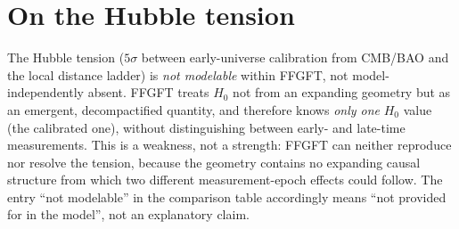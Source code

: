 
\section*{On the Hubble tension}

The Hubble tension ($5\sigma$ between early-universe calibration from
CMB/BAO and the local distance ladder) is \emph{not modelable} within FFGFT,
not model-independently absent. FFGFT treats $H_0$ not from an expanding
geometry but as an emergent, decompactified quantity, and therefore knows
\emph{only one} $H_0$ value (the calibrated one), without distinguishing
between early- and late-time measurements. This is a weakness, not a
strength: FFGFT can neither reproduce nor resolve the tension, because the
geometry contains no expanding causal structure from which two different
measurement-epoch effects could follow. The entry ``not modelable'' in the
comparison table accordingly means ``not provided for in the model'', not an
explanatory claim.
